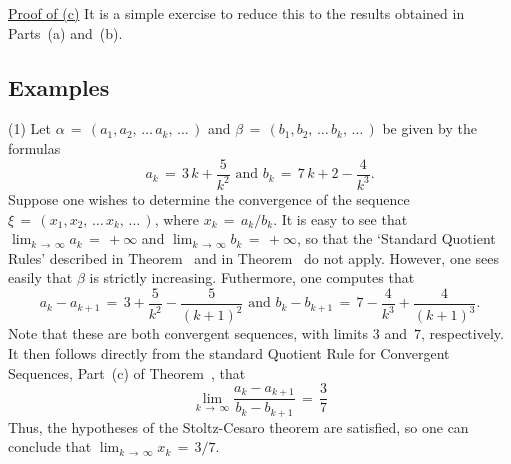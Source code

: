 \V

        \underline{Proof of (c)} It is a simple exercise to reduce this to the results obtained in Parts~(a) and~(b). %

\VV

            \subsection{\small{\bf Examples}}
            \label{RemrkC60.55B}

\V

\hspace*{\parindent}(1) Let ${\alpha} \,=\, (a_{1}, a_{2},\,{\ldots}\,a_{k},\,{\ldots}\,)$
    and ${\beta} \,=\, (b_{1}, b_{2},\,{\ldots}\,b_{k},\,{\ldots}\,)$ be given by the formulas
        \begin{displaymath}
        a_{k} \,=\, 3\,k + \frac{5}{k^{2}} \mbox{ and }
        b_{k} \,=\, 7\,k + 2 - \frac{4}{k^{3}}.
        \end{displaymath}
    Suppose one wishes to determine the convergence of the sequence ${\xi} \,=\, (x_{1}, x_{2},\,{\ldots}\,x_{k},\,{\ldots}\,)$, where $x_{k} \,=\, a_{k}/b_{k}$.
    It is easy to see that $\lim_{k \,{\rightarrow}\, {\infty}} a_{k} \,=\, +{\infty}$ and $\lim_{k \,{\rightarrow}\, {\infty}} b_{k} \,=\, +{\infty}$,
    so that the `Standard Quotient Rules' described in Theorem~ and in Theorem~ do not apply.
    However, one sees easily that ${\beta}$ is strictly increasing. Futhermore, one computes that
        \begin{displaymath}
        a_{k}-a_{k+1} \,=\, 3 + \frac{5}{k^{2}} - \frac{5}{(k+1)^{2}}
	\mbox{ and }
        b_{k} - b_{k+1} \,=\, 7 - \frac{4}{k^{3}} + \frac{4}{(k+1)^{3}}.
        \end{displaymath}
    Note that these are both convergent sequences, with limits $3$ and~$7$, respectively.
    It then follows directly from the standard Quotient Rule for Convergent Sequences, Part~(c) of Theorem~, that
        \begin{displaymath}
        \lim_{k \,{\rightarrow}\, {\infty}} \frac{a_{k}-a_{k+1}}{b_{k}-b_{k+1}}
     \,=\, \frac{3}{7}
        \end{displaymath}
    Thus, the hypotheses of the Stoltz-Cesaro theorem are satisfied, so one can conclude that $\lim_{k \,{\rightarrow}\, {\infty}} x_{k} \,=\, 3/7$.

\V

